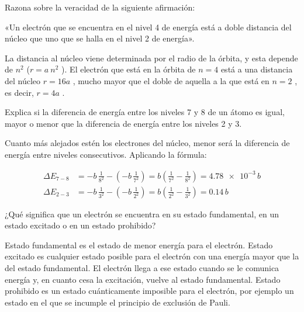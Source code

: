 \begin{question}
    Razona sobre la veracidad de la siguiente afirmación:

    «Un electrón que se encuentra en el nivel 4 de energía está a doble distancia del núcleo que uno que se halla en el nivel 2 de energía».
    \begin{solu}
        La distancia al núcleo viene determinada por el radio de la órbita, y esta depende de \(n^2\)  (\(r = a\ n^2\) ). El electrón que está en la órbita de \(n = 4\)  está a una distancia del núcleo \(r = 16a\) ,      mucho mayor que el doble de aquella a la que está en \(n = 2\) ,
        es decir, \(r = 4a\) .
    \end{solu}
\end{question}

\begin{question}
    Explica si la diferencia de energía entre los niveles 7 y 8 de un átomo es igual, mayor o menor que la diferencia de energía entre los niveles 2 y 3.
    \begin{solu}
        Cuanto más alejados estén los electrones del núcleo, menor será la diferencia de energía entre niveles consecutivos.
        Aplicando la fórmula:

        \begin{align*}
            \Delta E_{7-8} &= -b\,\frac{1}{8^2} - \left(-b\,\frac{1}{7^2}\right) = b\left(\frac{1}{7^2} - \frac{1}{8^2}\right) = \num{4.78e-3}\,b \\
            \Delta E_{2-3} &= -b\,\frac{1}{3^2} - \left(-b\,\frac{1}{2^2}\right) = b\left(\frac{1}{2^2} - \frac{1}{3^2}\right) = \num{0.14}\,b
        \end{align*}
    \end{solu}
\end{question}

\begin{question}
    ¿Qué significa que un electrón se encuentra en su estado fundamental, en un estado excitado o en un estado prohibido?
    \begin{solu}
        Estado fundamental es el estado de menor energía para el electrón.
        Estado excitado es cualquier estado posible para el electrón con una energía mayor que la del estado fundamental. El electrón llega a ese estado cuando se le comunica energía y,
        en cuanto cesa la excitación, vuelve al estado fundamental.
        Estado prohibido es un estado cuánticamente imposible para
        el electrón, por ejemplo un estado en el que se incumple el
        principio de exclusión de Pauli.
    \end{solu}
\end{question}

